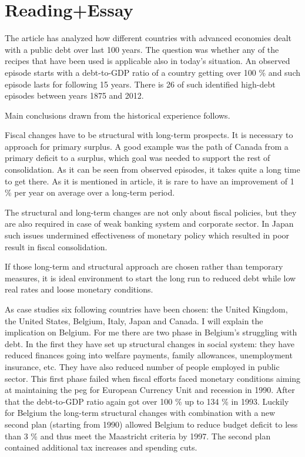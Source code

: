 \section{Reading+Essay}

The article has analyzed how different countries with advanced economies dealt with a public debt over last 100 years. The question was whether any of the recipes that have been used is applicable also in today's situation. An observed episode starts with a debt-to-GDP ratio of a country getting over 100 \% and such episode lasts for following 15 years. There is 26 of such identified high-debt episodes between years 1875 and 2012.

Main conclusions drawn from the historical experience follows.

Fiscal changes have to be structural with long-term prospects. It is necessary to approach for primary surplus. A good example was the path of Canada from a primary deficit to a surplus, which goal was needed to support the rest of consolidation. As it can be seen from observed episodes, it takes quite a long time to get there. As it is mentioned in article, it is rare to have an improvement of 1 \% per year on average over a long-term period.
 
The structural and long-term changes are not only about fiscal policies, but they are also required in case of weak banking system and corporate sector. In Japan such issues undermined effectiveness of monetary policy which resulted in poor result in fiscal consolidation.

If those long-term and structural approach are chosen rather than temporary measures, it is ideal environment to start the long run to reduced debt while low real rates and loose monetary conditions.
 
As case studies six following countries have been chosen: the United Kingdom, the United States, Belgium, Italy, Japan and Canada. I will explain the implication on Belgium. For me there are two phase in Belgium's struggling with debt. In the first they have set up structural changes in social system: they have reduced finances going into welfare payments, family allowances, unemployment insurance, etc. They have also reduced number of people employed in public sector. This first phase failed when fiscal efforts faced monetary conditions aiming at maintaining the peg for European Currency Unit and recession in 1990. After that the debt-to-GDP ratio again got over 100 \% up to 134 \% in 1993. Luckily for Belgium the long-term structural changes with combination with a new second plan (starting from 1990) allowed Belgium to reduce budget deficit to less than 3 \% and thus meet the Maastricht criteria by 1997. The second plan contained additional tax increases and spending cuts.

